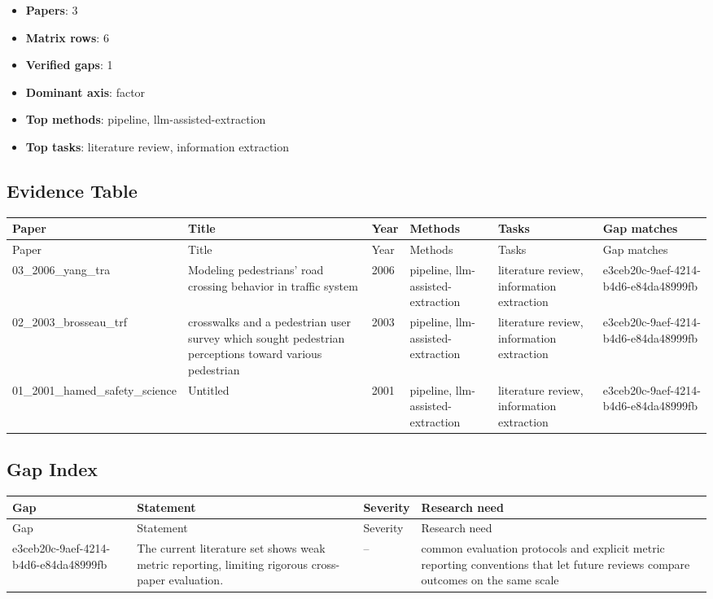 \documentclass{article}
\begin{document}
\begin{itemize}
\item \textbf{Papers}: 3
\item \textbf{Matrix rows}: 6
\item \textbf{Verified gaps}: 1
\item \textbf{Dominant axis}: factor
\item \textbf{Top methods}: pipeline, llm-assisted-extraction
\item \textbf{Top tasks}: literature review, information extraction
\end{itemize}

\subsection{Evidence Table}
\begin{longtable}{p{}p{}p{}p{}p{}p{}}
\toprule
Paper & Title & Year & Methods & Tasks & Gap matches \\
\midrule
\endfirsthead
\toprule
Paper & Title & Year & Methods & Tasks & Gap matches \\
\midrule
\endhead
03\_2006\_yang\_tra & Modeling pedestrians’ road crossing behavior in traffic system & 2006 & pipeline, llm-assisted-extraction & literature review, information extraction & e3ceb20c-9aef-4214-b4d6-e84da48999fb \\
02\_2003\_brosseau\_trf & crosswalks and a pedestrian user survey which sought pedestrian perceptions toward various pedestrian & 2003 & pipeline, llm-assisted-extraction & literature review, information extraction & e3ceb20c-9aef-4214-b4d6-e84da48999fb \\
01\_2001\_hamed\_safety\_science & Untitled & 2001 & pipeline, llm-assisted-extraction & literature review, information extraction & e3ceb20c-9aef-4214-b4d6-e84da48999fb \\
\bottomrule
\end{longtable}

\subsection{Gap Index}
\begin{longtable}{p{}p{}p{}p{}}
\toprule
Gap & Statement & Severity & Research need \\
\midrule
\endfirsthead
\toprule
Gap & Statement & Severity & Research need \\
\midrule
\endhead
e3ceb20c-9aef-4214-b4d6-e84da48999fb & The current literature set shows weak metric reporting, limiting rigorous cross-paper evaluation. & -- & common evaluation protocols and explicit metric reporting conventions that let future reviews compare outcomes on the same scale \\
\bottomrule
\end{longtable}
\end{document}
